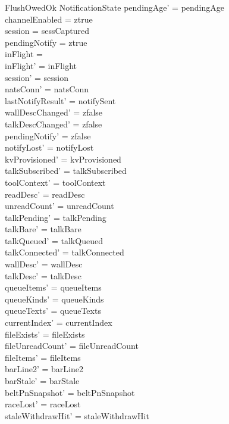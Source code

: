 \documentclass[a4paper,10pt,fleqn]{article}
\begin{document}
\begin{schema}{FlushOwedOk}
  \Delta NotificationState
  \where
  pendingAge' = pendingAge \\
  channelEnabled = ztrue \\
  session = sessCaptured \\
  pendingNotify = ztrue \\
  inFlight = \emptyset \\
  inFlight' = inFlight \\
  session' = session \\
  natsConn' = natsConn \\
  lastNotifyResult' = notifySent \\
  wallDescChanged' = zfalse \\
  talkDescChanged' = zfalse \\
  pendingNotify' = zfalse \\
  notifyLost' = notifyLost \\
  kvProvisioned' = kvProvisioned \\
  talkSubscribed' = talkSubscribed \\
  toolContext' = toolContext \\
  readDesc' = readDesc \\
  unreadCount' = unreadCount \\
  talkPending' = talkPending \\
  talkBare' = talkBare \\
  talkQueued' = talkQueued \\
  talkConnected' = talkConnected \\
  wallDesc' = wallDesc \\
  talkDesc' = talkDesc \\
  queueItems' = queueItems \\
  queueKinds' = queueKinds \\
  queueTexts' = queueTexts \\
  currentIndex' = currentIndex \\
  fileExists' = fileExists \\
  fileUnreadCount' = fileUnreadCount \\
  fileItems' = fileItems \\
  barLine2' = barLine2 \\
  barStale' = barStale \\
  beltPnSnapshot' = beltPnSnapshot \\
  raceLost' = raceLost \\
  staleWithdrawHit' = staleWithdrawHit \\

\end{schema}
\end{document}
